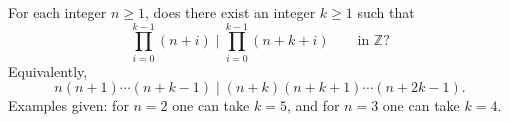 For each integer $n\ge 1$, does there exist an integer $k\ge 1$ such that
\begin{equation}
\label{eq:P389-main}
\prod_{i=0}^{k-1}(n+i)\;\Big|\;\prod_{i=0}^{k-1}(n+k+i)
\qquad\text{in }\mathbb Z?
\end{equation}
Equivalently,
\[
 n(n+1)\cdots(n+k-1) \mid (n+k)(n+k+1)\cdots(n+2k-1).
\]
Examples given: for $n=2$ one can take $k=5$, and for $n=3$ one can take $k=4$.

